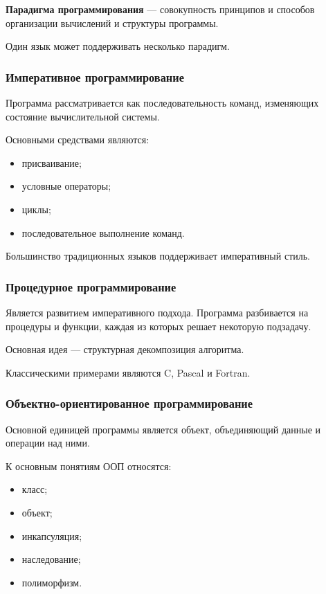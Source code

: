 \textbf{Парадигма программирования} --- совокупность принципов и способов
организации вычислений и структуры программы.

Один язык может поддерживать несколько парадигм.

\subsubsection*{Императивное программирование}

Программа рассматривается как последовательность команд, изменяющих состояние
вычислительной системы.

Основными средствами являются:

\begin{itemize}
	\item присваивание;
	\item условные операторы;
	\item циклы;
	\item последовательное выполнение команд.
\end{itemize}

Большинство традиционных языков поддерживает императивный стиль.

\subsubsection*{Процедурное программирование}

Является развитием императивного подхода. Программа разбивается на процедуры
и функции, каждая из которых решает некоторую подзадачу.

Основная идея --- структурная декомпозиция алгоритма.

Классическими примерами являются C, Pascal и Fortran.

\subsubsection*{Объектно-ориентированное программирование}

Основной единицей программы является объект, объединяющий данные и операции над
ними.

К основным понятиям ООП относятся:

\begin{itemize}
	\item класс;
	\item объект;
	\item инкапсуляция;
	\item наследование;
	\item полиморфизм.
\end{itemize}

